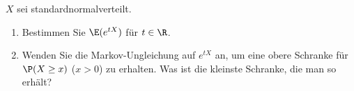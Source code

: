 
\begin{exercise}

$X$ sei standardnormalverteilt.

\begin{enumerate}[label = (\alph*)]

    \item Bestimmen Sie $\E(e^{t X})$ für $t \in \R$.

    \item Wenden Sie die Markov-Ungleichung auf $e^{t X}$ an, um eine obere Schranke für $\P(X \geq x)$ ($x > 0$) zu erhalten.
    Was ist die kleinste Schranke, die man so erhält?

\end{enumerate}

\end{exercise}


